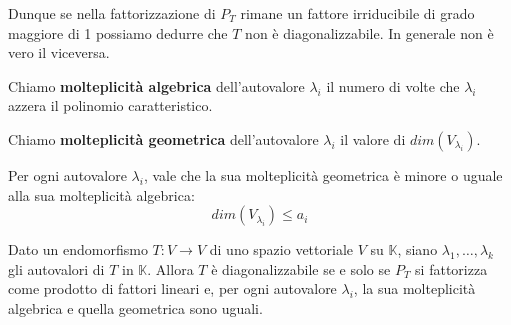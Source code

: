 Dunque se nella fattorizzazione di $P_T$ rimane un fattore irriducibile di grado
maggiore di 1 possiamo dedurre che $T$ non \`e diagonalizzabile. In generale non
\`e vero il viceversa.

\begin{defn}
	Chiamo \textbf{molteplicit\`a algebrica} dell'autovalore $\lambda_i$ il numero di volte
	che $\lambda_i$ azzera il polinomio caratteristico.
\end{defn}

\begin{defn}
	Chiamo \textbf{molteplicit\`a geometrica} dell'autovalore $\lambda_i$ il valore di
	$dim(V_{\lambda_i})$.
\end{defn}

\begin{theorem}
	Per ogni autovalore $\lambda_i$, vale che la sua molteplicit\`a
	geometrica \`e minore o uguale alla sua molteplicit\`a algebrica:
	\begin{equation*}
		dim(V_{\lambda_i}) \leq a_i
	\end{equation*}
\end{theorem}

\begin{theorem}
	Dato un endomorfismo $T : V \to V$ di uno spazio vettoriale $V$ su
	$\mathbb{K}$, siano $\lambda_1, \dots, \lambda_k$ gli autovalori di $T$ in
	$\mathbb{K}$. Allora $T$ \`e diagonalizzabile se e solo se $P_T$ si fattorizza
	come prodotto di fattori lineari e, per ogni autovalore $\lambda_i$, la sua
	molteplicit\`a algebrica e quella geometrica sono uguali.
\end{theorem}

